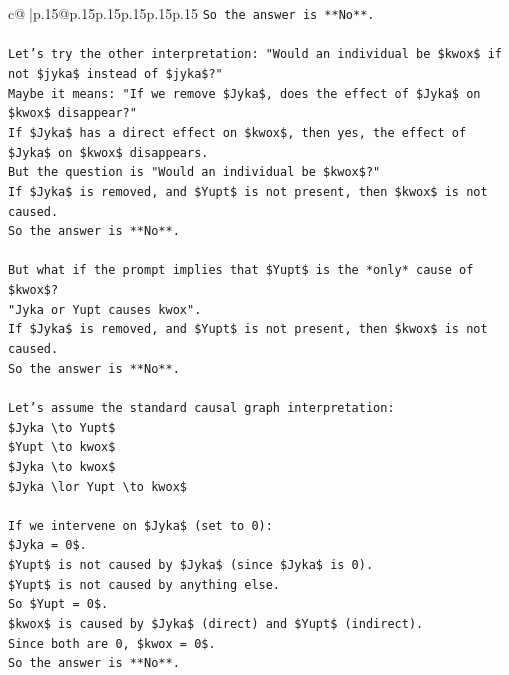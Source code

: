 \documentclass{article}
\begin{document}
{\begin{supertabular}{c@{$\;$}|p{.15\linewidth}@{}p{.15\linewidth}p{.15\linewidth}p{.15\linewidth}p{.15\linewidth}p{.15\linewidth}}
{{{\texttt{So the answer is **No**.} \\
\\ 
\texttt{Let's try the other interpretation: "Would an individual be \$kwox\$ if not \$jyka\$ instead of \$jyka\$?"} \\
\texttt{Maybe it means: "If we remove \$Jyka\$, does the effect of \$Jyka\$ on \$kwox\$ disappear?"} \\
\texttt{If \$Jyka\$ has a direct effect on \$kwox\$, then yes, the effect of \$Jyka\$ on \$kwox\$ disappears.} \\
\texttt{But the question is "Would an individual be \$kwox\$?"} \\
\texttt{If \$Jyka\$ is removed, and \$Yupt\$ is not present, then \$kwox\$ is not caused.} \\
\texttt{So the answer is **No**.} \\
\\ 
\texttt{But what if the prompt implies that \$Yupt\$ is the *only* cause of \$kwox\$?} \\
\texttt{"Jyka or Yupt causes kwox".} \\
\texttt{If \$Jyka\$ is removed, and \$Yupt\$ is not present, then \$kwox\$ is not caused.} \\
\texttt{So the answer is **No**.} \\
\\ 
\texttt{Let's assume the standard causal graph interpretation:} \\
\texttt{\$Jyka \textbackslash{}to Yupt\$} \\
\texttt{\$Yupt \textbackslash{}to kwox\$} \\
\texttt{\$Jyka \textbackslash{}to kwox\$} \\
\texttt{\$Jyka \textbackslash{}lor Yupt \textbackslash{}to kwox\$} \\
\\ 
\texttt{If we intervene on \$Jyka\$ (set to 0):} \\
\texttt{\$Jyka = 0\$.} \\
\texttt{\$Yupt\$ is not caused by \$Jyka\$ (since \$Jyka\$ is 0).} \\
\texttt{\$Yupt\$ is not caused by anything else.} \\
\texttt{So \$Yupt = 0\$.} \\
\texttt{\$kwox\$ is caused by \$Jyka\$ (direct) and \$Yupt\$ (indirect).} \\
\texttt{Since both are 0, \$kwox = 0\$.} \\
\texttt{So the answer is **No**.} \\
}}}
\end{supertabular}}
\end{document}
